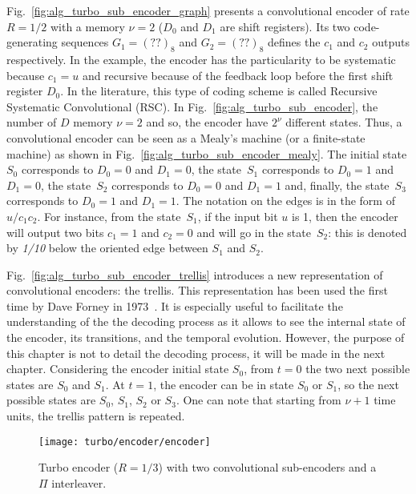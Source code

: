 Fig.~\ref{fig:alg_turbo_sub_encoder_graph} presents a convolutional encoder of
rate $R = 1/2$ with a memory $\nu = 2$ ($D_0$ and $D_1$ are shift registers).
Its two code-generating sequences $G_1 = (??)_8$ and $G_2 = (??)_8$ defines the
$c_1$ and $c_2$ outputs respectively. In the example, the encoder has the
particularity to be systematic because $c_1 = u$ and recursive because of the
feedback loop before the first shift register $D_0$. In the literature, this
type of coding scheme is called Recursive Systematic Convolutional (RSC). In
Fig.~\ref{fig:alg_turbo_sub_encoder}, the number of $D$ memory $\nu = 2$ and
so, the encoder have $2^\nu$ different states. Thus, a convolutional encoder can
be seen as a Mealy's machine (or a finite-state machine) as shown in
Fig.~\ref{fig:alg_turbo_sub_encoder_mealy}. The initial state $S_0$ corresponds
to $D_0 = 0$ and $D_1 = 0$, the state~$S_1$ corresponds to $D_0 = 1$ and
$D_1 = 0$, the state~$S_2$ corresponds to $D_0 = 0$ and $D_1 = 1$ and, finally,
the state~$S_3$ corresponds to $D_0 = 1$ and $D_1 = 1$. The notation on the
edges is in the form of $u/c_1c_2$. For instance, from the state~$S_1$, if the
input bit $u$ is 1, then the encoder will output two bits $c_1 = 1$ and
$c_2 = 0$ and will go in the state~$S_2$: this is denoted by \emph{1/10} below
the oriented edge between $S_1$ and $S_2$.

Fig.~\ref{fig:alg_turbo_sub_encoder_trellis} introduces a new representation of
convolutional encoders: the trellis. This representation has been used the first
time by Dave Forney in 1973~\cite{Forney1973}. It is especially useful to
facilitate the understanding of the the decoding process as it allows to see the
internal state of the encoder, its transitions, and the temporal evolution.
However, the purpose of this chapter is not to detail the decoding process, it
will be made in the next chapter. Considering the encoder initial state $S_0$,
from $t = 0$ the two next possible states are $S_0$ and $S_1$. At $t = 1$, the
encoder can be in state $S_0$ or $S_1$, so the next possible states are $S_0$,
$S_1$, $S_2$ or $S_3$. One can note that starting from $\nu +1$ time units, the
trellis pattern is repeated.

\begin{figure}[htp]
  \centering
  \texttt{[image: turbo/encoder/encoder]}
  \caption{Turbo encoder ($R = 1/3$) with two convolutional sub-encoders and a
    $\Pi$ interleaver.}
  \label{fig:alg_turbo_encoder}
\end{figure}

